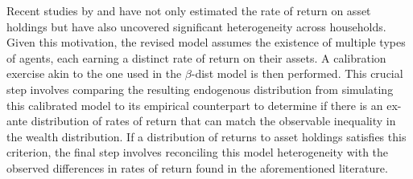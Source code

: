 \par Recent studies by \cite{aflgdmlp20} and \cite{lblcps18} have not only estimated the rate of return on asset holdings but have also uncovered significant heterogeneity across households. Given this motivation, the revised model assumes the existence of multiple types of agents, each earning a distinct rate of return on their assets. A calibration exercise akin to the one used in the $\beta$-dist model is then performed. This crucial step involves comparing the resulting endogenous distribution from simulating this calibrated model to its empirical counterpart to determine if there is an ex-ante distribution of rates of return that can match the observable inequality in the wealth distribution. If a distribution of returns to asset holdings satisfies this criterion, the final step involves reconciling this model heterogeneity with the observed differences in rates of return found in the aforementioned literature.

